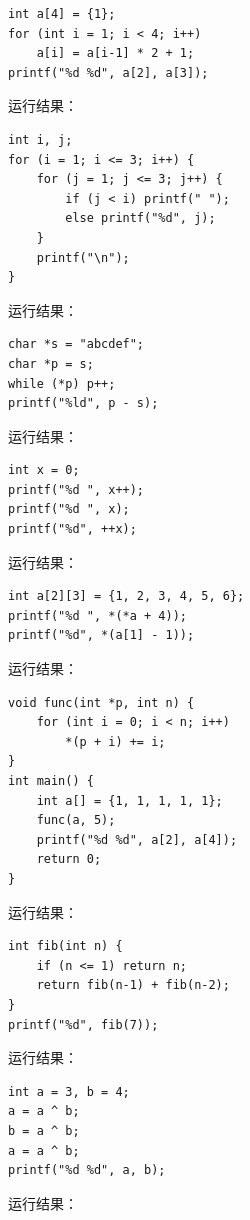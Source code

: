 \documentclass[a4paper,11pt]{article}
\begin{document}
\q
\begin{lstlisting}[language={[custom]C}]
int a[4] = {1};
for (int i = 1; i < 4; i++)
    a[i] = a[i-1] * 2 + 1;
printf("%d %d", a[2], a[3]);
\end{lstlisting}
运行结果：\underline{\hspace{3cm}}


\q
\begin{lstlisting}[language={[custom]C}]
int i, j;
for (i = 1; i <= 3; i++) {
    for (j = 1; j <= 3; j++) {
        if (j < i) printf(" ");
        else printf("%d", j);
    }
    printf("\n");
}
\end{lstlisting}
运行结果：\underline{\hspace{3cm}}


\q
\begin{lstlisting}[language={[custom]C}]
char *s = "abcdef";
char *p = s;
while (*p) p++;
printf("%ld", p - s);
\end{lstlisting}
运行结果：\underline{\hspace{3cm}}


\q
\begin{lstlisting}[language={[custom]C}]
int x = 0;
printf("%d ", x++);
printf("%d ", x);
printf("%d", ++x);
\end{lstlisting}
运行结果：\underline{\hspace{3cm}}


\q
\begin{lstlisting}[language={[custom]C}]
int a[2][3] = {1, 2, 3, 4, 5, 6};
printf("%d ", *(*a + 4));
printf("%d", *(a[1] - 1));
\end{lstlisting}
运行结果：\underline{\hspace{3cm}}


\q
\begin{lstlisting}[language={[custom]C}]
void func(int *p, int n) {
    for (int i = 0; i < n; i++)
        *(p + i) += i;
}
int main() {
    int a[] = {1, 1, 1, 1, 1};
    func(a, 5);
    printf("%d %d", a[2], a[4]);
    return 0;
}
\end{lstlisting}
运行结果：\underline{\hspace{3cm}}


\q
\begin{lstlisting}[language={[custom]C}]
int fib(int n) {
    if (n <= 1) return n;
    return fib(n-1) + fib(n-2);
}
printf("%d", fib(7));
\end{lstlisting}
运行结果：\underline{\hspace{3cm}}


\q
\begin{lstlisting}[language={[custom]C}]
int a = 3, b = 4;
a = a ^ b;
b = a ^ b;
a = a ^ b;
printf("%d %d", a, b);
\end{lstlisting}
运行结果：\underline{\hspace{3cm}}
\end{document}
